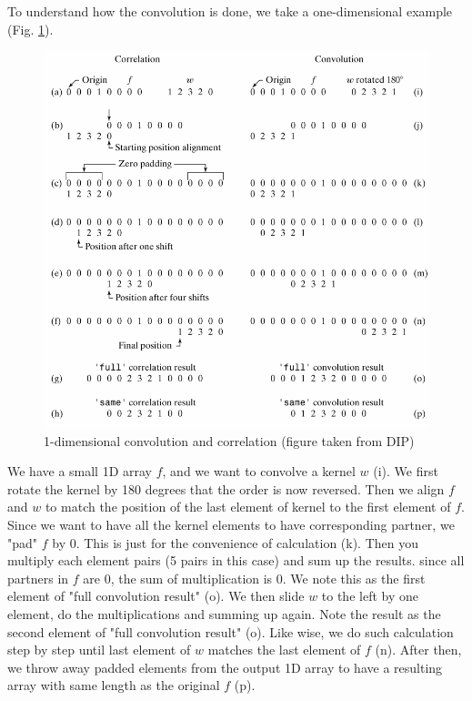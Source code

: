 To understand how the convolution is done, we take a one-dimensional
example (Fig. \ref{fig:img39}).


\begin{figure}[htbp]
\begin{center}
\includegraphics[width=11.718cm]{img/CMCIBasicCourse201102-img39.png}
\caption{ 1-dimensional convolution and correlation (figure taken from DIP)}
\label{fig:img39}
\end{center}
\end{figure}

We have a small 1D array $f$, and we want to convolve a
kernel $w$ (i). We first rotate the kernel by 180 degrees that
the order is now reversed. Then we align $f$ and $w$ to
match the position of the last element of kernel to the first element
of $f$. Since we want to have all the kernel elements to have
corresponding partner, we "pad" $f$ by 0.
This is just for the convenience of calculation (k). Then you multiply
each element pairs (5 pairs in this case) and sum up the results. since
all partners in $f$ are 0, the sum of multiplication is 0. We note this
as the first element of "full convolution
result" (o). We then slide $w$ to the left by one
element, do the multiplications and summing up again. Note the result
as the second element of "full convolution
result" (o). Like wise, we do such calculation step by
step until last element of $w$ matches the last element of
$f$ (n). After then, we throw away padded elements from the
output 1D array to have a resulting array with same length as the
original $f$ (p). 

